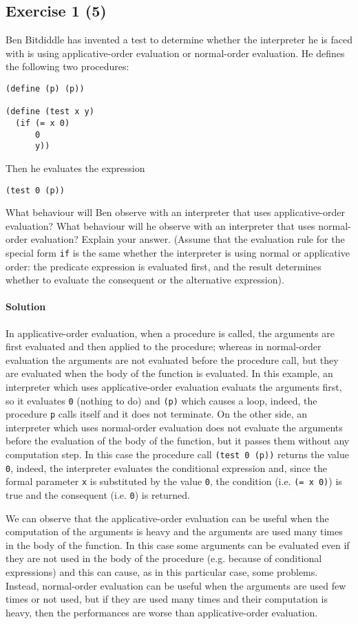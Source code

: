 \subsection*{Exercise 1 (5)}
Ben Bitdiddle has invented a test to determine whether the interpreter he is faced with is using applicative-order evaluation 
or normal-order evaluation. He defines the following two procedures:

\begin{lstlisting}
(define (p) (p))

(define (test x y)
  (if (= x 0)
      0
      y))
\end{lstlisting}

Then he evaluates the expression

\begin{lstlisting}
(test 0 (p))
\end{lstlisting}

What behaviour will Ben observe with an interpreter that uses applicative-order evaluation? What behaviour will he
observe with an interpreter that uses normal-order evaluation? Explain your answer. (Assume that the evaluation
rule for the special form \texttt{if} is the same whether the interpreter is using normal or applicative order: the predicate 
expression is evaluated first, and the result determines whether to evaluate the consequent or the alternative expression).

\paragraph{Solution}
In applicative-order evaluation, when a procedure is called, the arguments are first evaluated and then applied to the
procedure; whereas in normal-order evaluation the arguments are not evaluated before the procedure call, but they are evaluated
when the body of the function is evaluated.
In this example, an interpreter which uses applicative-order evaluation evaluats the arguments first, so it evaluates \texttt{0} 
(nothing to do) and \texttt{(p)} which causes a loop, indeed, the procedure \texttt{p} calls itself and it does not terminate.
On the other side, an interpreter which uses normal-order evaluation does not evaluate the arguments before the evaluation of
the body of the function, but it passes them without any computation step. In this case the procedure call \texttt{(test 0 (p))}
returns the value \texttt{0}, indeed, the interpreter evaluates the conditional expression and, since the formal parameter \texttt{x}
is substituted by the value \texttt{0}, the condition (i.e. \texttt{(= x 0)}) is true and the consequent (i.e. \texttt{0}) is returned.

We can observe that the applicative-order evaluation can be useful when the computation of the arguments is heavy and the arguments are
used many times in the body of the function. In this case some arguments can be evaluated even if they are not used in the body of the
procedure (e.g. because of conditional expressions) and this can cause, as in this particular case, some problems.
Instead, normal-order evaluation can be useful when the arguments are used few times or not used, but if they are used many times 
and their computation is heavy, then the performances are worse than applicative-order evaluation.